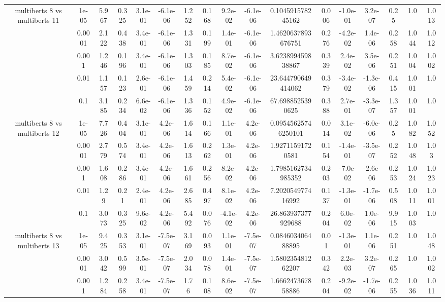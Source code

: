 \begin{tabular}{|c|c|c|c|c|c|c|c|c|c|c|c|c|c|c|c|c|}
\hline
\multirow{5}{*}{multiberts 8 vs multiberts 11} & 1e-05 & 5.967 & 0.325 & 3.1e-01 & -6.1e-06 & 1.252 & 0.168 & 9.2e-02 & -6.1e-06 & 0.104591578245162 & 0.006 & -1.0e-01 & 3.2e-07 & 0.25 & 1.0 & 1.013 \\
 & 0.0001 & 2.122 & 0.438 & 3.4e-01 & -6.1e-06 & 1.331 & 0.199 & 1.4e-01 & -6.1e-06 & 1.4620637893676751 & 0.276 & -4.2e-02 & 1.4e-06 & 0.258 & 1.044 & 1.012 \\
 & 0.001 & 1.246 & 0.196 & 3.4e-01 & -6.1e-06 & 1.303 & 0.185 & 8.7e-02 & -6.1e-06 & 3.623899459838867 & 0.339 & 2.4e-02 & 3.5e-06 & 0.251 & 1.004 & 1.002 \\
 & 0.01 & 1.157 & 0.123 & 2.6e-01 & -6.1e-06 & 1.459 & 0.214 & 5.4e-02 & -6.1e-06 & 23.644790649414062 & 0.379 & -3.4e-02 & -1.3e-06 & 0.415 & 1.001 & 1.0 \\
 & 0.1 & 3.185 & 0.234 & 6.6e-02 & -6.1e-06 & 1.336 & 0.152 & 4.9e-02 & -6.1e-06 & 67.6988525390625 & 0.388 & 2.7e-01 & -3.3e-07 & 1.357 & 1.001 & 1.0 \\
\hline
\multirow{5}{*}{multiberts 8 vs multiberts 12} & 1e-05 & 7.726 & 0.404 & 3.1e-01 & 4.2e-06 & 1.614 & 0.166 & 1.1e-01 & 4.2e-06 & 0.09545625746250101 & 0.014 & 3.1e-02 & -6.0e-06 & 0.25 & 1.082 & 1.052 \\
 & 0.0001 & 2.779 & 0.574 & 3.4e-01 & 4.2e-06 & 1.613 & 0.262 & 1.3e-01 & 4.2e-06 & 1.92711591720581 & 0.154 & -1.4e-01 & -3.5e-07 & 0.252 & 1.048 & 1.03 \\
 & 0.001 & 1.608 & 0.286 & 3.4e-01 & 4.2e-06 & 1.661 & 0.256 & 8.2e-02 & 4.2e-06 & 1.7985162734985352 & 0.203 & -7.0e-02 & -2.6e-06 & 0.253 & 1.024 & 1.023 \\
 & 0.01 & 1.29 & 0.21 & 2.4e-01 & 4.2e-06 & 2.685 & 0.497 & 8.1e-02 & 4.2e-06 & 7.202054977416992 & 0.137 & -1.3e-01 & -1.7e-06 & 0.508 & 1.011 & 1.001 \\
 & 0.1 & 3.073 & 0.325 & 9.6e-02 & 4.2e-06 & 5.492 & 0.076 & -4.1e-02 & 4.2e-06 & 26.863937377929688 & 0.204 & 6.0e-02 & 1.0e-06 & 9.915 & 1.003 & 1.0 \\
\hline
\multirow{5}{*}{multiberts 8 vs multiberts 13} & 1e-05 & 9.425 & 0.353 & 3.1e-01 & -7.5e-07 & 3.169 & 0.093 & 1.1e-01 & -7.5e-07 & 0.084603406488895 & 0.01 & -1.3e-01 & 1.1e-06 & 0.251 & 1.0 & 1.048 \\
 & 0.0001 & 3.042 & 0.599 & 3.5e-01 & -7.5e-07 & 2.034 & 0.078 & 1.4e-01 & -7.5e-07 & 1.580235481262207 & 0.342 & 2.2e-03 & 3.2e-07 & 0.265 & 1.0 & 1.002 \\
 & 0.001 & 1.284 & 0.258 & 3.4e-01 & -7.5e-07 & 1.76 & 0.108 & 8.6e-02 & -7.5e-07 & 1.666247367858886 & 0.204 & -9.2e-02 & -1.7e-06 & 0.255 & 1.036 & 1.011 \\

\end{tabular}
